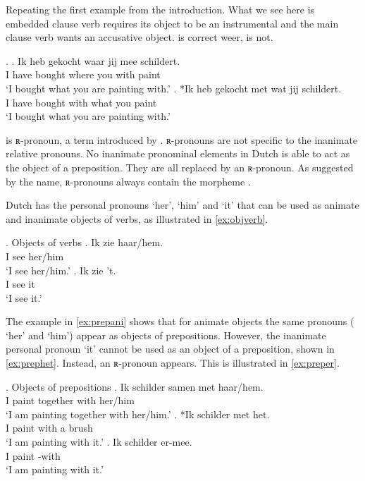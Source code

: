 \documentclass{article}
\begin{document}
Repeating the first example from the introduction. What we see here is embedded clause verb requires its object to be an instrumental and the main clause verb wants an accusative object.  is correct weer,  is not.

\ex.
\ag. Ik heb gekocht waar jij mee schildert.\\
 I have bought where you with paint\\
 `I bought what you are painting with.'
\bg. *Ik heb gekocht met wat jij schildert.\\
 I have bought with what you paint\\
 `I bought what you are painting with.'

  is ʀ-pronoun, a term introduced by \cite{riemsdijk1978}. ʀ-pronouns are not specific to the inanimate relative pronouns. No inanimate pronominal elements in Dutch is able to act as the object of a preposition. They are all replaced by an ʀ-pronoun. As suggested by the name, ʀ-pronouns always contain the morpheme .

 Dutch has the personal pronouns  `her',  `him' and  `it' that can be used as animate and inanimate objects of verbs, as illustrated in \ref{ex:objverb}.

 \ex. Objects of verbs \label{ex:objverb}
 \ag. Ik zie haar/hem.\\
  I see her/him\\
  `I see her/him.'\label{ex:aniobj}
 \bg. Ik zie 't.\\
  I see it\\
  `I see it.'\label{ex:inaniobj}

The example in \ref{ex:prepani} shows that for animate objects the same pronouns ( `her' and  `him') appear as objects of prepositions. However, the inanimate personal pronoun  `it' cannot be used as an object of a preposition, shown in \ref{ex:prephet}. Instead, an ʀ-pronoun appears. This is illustrated in \ref{ex:preper}.




\ex. Objects of prepositions \label{ex:objprep}
\ag. Ik schilder samen met haar/hem.\\
 I paint together with her/him\\
 `I am painting together with her/him.'\label{ex:prepani}
\bg. *Ik schilder met het.\\
 I paint with a brush\\
 `I am painting with it.'\label{ex:prephet}
\bg. Ik schilder er-mee.\\
 I paint -with\\
 `I am painting with it.'\label{ex:preper}
\end{document}
